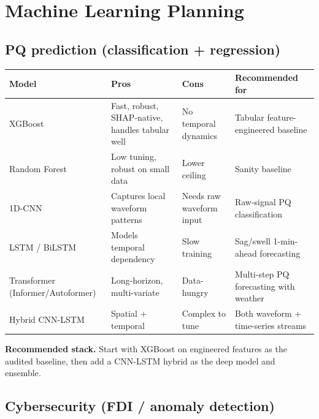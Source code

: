\documentclass[11pt,a4paper]{article}
\begin{document}
\section{Machine Learning Planning}

\subsection{PQ prediction (classification + regression)}

\begin{table}[H]
\centering
\small
\begin{tabular}{p{2.6cm}p{4.6cm}p{4.6cm}p{3.0cm}}
\toprule
\textbf{Model} & \textbf{Pros} & \textbf{Cons} & \textbf{Recommended for} \\
\midrule
XGBoost & Fast, robust, SHAP-native, handles tabular well & No temporal
dynamics & Tabular feature-engineered baseline \\
Random Forest & Low tuning, robust on small data & Lower ceiling & Sanity
baseline \\
1D-CNN & Captures local waveform patterns & Needs raw waveform input &
Raw-signal PQ classification \\
LSTM / BiLSTM & Models temporal dependency & Slow training & Sag/swell
1-min-ahead forecasting \\
Transformer (Informer/Autoformer) & Long-horizon, multi-variate &
Data-hungry & Multi-step PQ forecasting with weather \\
Hybrid CNN-LSTM & Spatial + temporal & Complex to tune & Both waveform +
time-series streams \\
\bottomrule
\end{tabular}
\end{table}

\textbf{Recommended stack.}\enspace
Start with XGBoost on engineered features as the audited baseline, then
add a CNN-LSTM hybrid as the deep model and ensemble.

\subsection{Cybersecurity (FDI / anomaly detection)}
\end{document}
